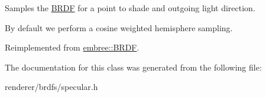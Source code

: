Samples the \hyperlink{classembree_1_1_b_r_d_f}{BRDF} for a point to shade and outgoing light direction. 

By default we perform a cosine weighted hemisphere sampling. 

Reimplemented from \hyperlink{classembree_1_1_b_r_d_f_a6eb1a114a4f36dc2c1ad65bcbce5f809}{embree::BRDF}.



The documentation for this class was generated from the following file:\begin{DoxyCompactItemize}
\item 
renderer/brdfs/specular.h\end{DoxyCompactItemize}
